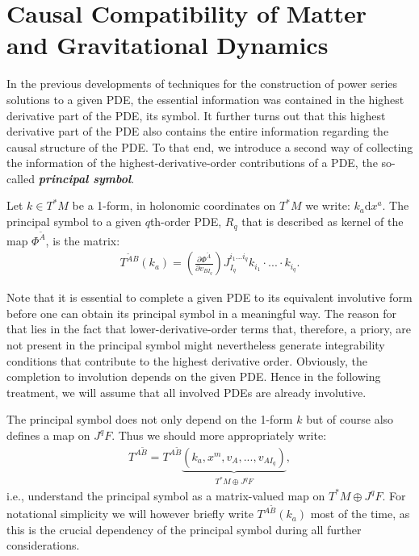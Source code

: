 \section{Causal Compatibility of Matter and Gravitational Dynamics}
In the previous developments of techniques for the construction of power series solutions to a given PDE, the essential information was contained in the highest derivative part of the PDE, its symbol. 
It further turns out that this highest derivative part of the PDE also contains the entire information regarding the causal structure of the PDE. To that end, we introduce a second way of collecting the information of the highest-derivative-order contributions of a PDE, the so-called \textbf{\textit{principal symbol}}.
\begin{definition} \label{PSym}
Let $ k \in T^{\ast}M$ be a  1-form, in holonomic coordinates on $T^{\ast}M$ we write: $k_{a} \mathrm{d}x^a$. The principal symbol to a given $q$th-order PDE, $R_q$ that is described as kernel of the map $\Phi^{\tilde{A}}$, is the matrix:
\begin{align}
    T^{\tilde{A} B}(k_a) = \left ( \frac{\partial \Phi^{\tilde{A}}}{\partial v_{BI_q}} \right ) J_{I_q}^{i_1...i_q} k_{i_1} \cdot ... \cdot k_{i_q}.
\end{align}
\end{definition}
\begin{remark}
Note that it is essential to complete a given PDE to its equivalent involutive form before one can obtain its principal symbol in a meaningful way. The reason for that lies in the fact that lower-derivative-order terms that, therefore, a priory, are not present in the principal symbol might nevertheless generate integrability conditions that contribute to the highest derivative order. Obviously, the completion to involution depends on the given PDE. Hence in the following treatment, we will assume that all involved PDEs are already involutive.
\end{remark}
The principal symbol does not only depend on the 1-form $k$ but of course also defines a map on $J^qF$. Thus we should more appropriately write:
\begin{align}
    T^{A\tilde{B}} = T^{A\tilde{B}}\underbrace{(k_a,x^m,v_A,...,v_{AI_q})}_{T^{\ast}M \oplus J^qF},
\end{align}
i.e., understand the principal symbol as a matrix-valued map on $T^{\ast}M \oplus J^qF$. 
For notational simplicity we will however briefly write $T^{A\tilde{B}}(k_a)$ most of the time, as this is the crucial dependency of the principal symbol during all further considerations.

